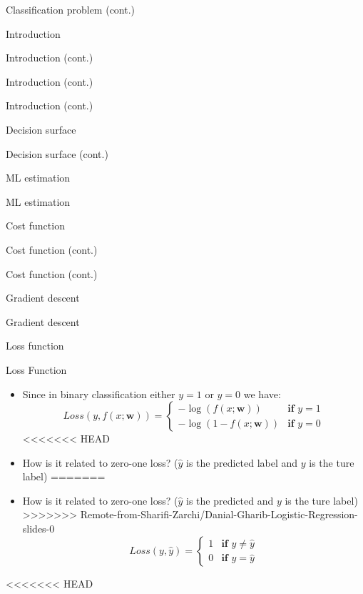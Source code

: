 \documentclass[serif, aspectratio=169]{beamer}
\begin{document}
\begin{frame}{Classification problem (cont.)}
\begin{itemize}
\begin{frame}{Introduction}
\begin{itemize}
\begin{frame}{Introduction (cont.)}
\begin{frame}{Introduction (cont.)}
\begin{frame}{Introduction (cont.)}
\begin{frame}{Decision surface}
\begin{itemize}
\begin{frame}{Decision surface (cont.)}
\begin{frame}{ML estimation}
\begin{frame}{ML estimation}
\begin{itemize}
\begin{frame}{Cost function}
\begin{frame}{Cost function (cont.)}
\begin{itemize}
\begin{itemize}
\begin{frame}{Cost function (cont.)}
\begin{frame}{Gradient descent}
\begin{frame}{Gradient descent}
\begin{frame}{Loss function}
\begin{frame}{Loss Function}
\begin{itemize}
        \item Since in binary classification either $y=1$ or $y=0$ we have:
            \[
                Loss(y, f(x; \mathbf{w})) = \begin{cases}
                    - \log (f(x; \mathbf{w})) & \textbf{if } y = 1 \\
                    - \log (1 - f(x; \mathbf{w})) & \textbf{if } y = 0
                \end{cases}
            \]
<<<<<<< HEAD
        \item How is it related to zero-one loss? ($\hat{y}$ is the predicted label and $y$ is the ture label)
=======
        \item How is it related to zero-one loss? ($\hat{y}$ is the predicted and $y$ is the ture label)
>>>>>>> Remote-from-Sharifi-Zarchi/Danial-Gharib-Logistic-Regression-slides-0
           \[
               Loss(y, \hat{y}) =  \begin{cases}
                    1 & \textbf{if } y \neq \hat{y} \\
                    0 & \textbf{if } y = \hat{y}
                \end{cases}
            \]
    \end{itemize}
\end{frame}

<<<<<<< HEAD


\end{frame}
\end{frame}
\end{frame}
\end{frame}
\end{itemize}
\end{itemize}
\end{frame}
\end{frame}
\end{itemize}
\end{frame}
\end{frame}
\end{frame}
\end{itemize}
\end{frame}
\end{frame}
\end{frame}
\end{frame}
\end{itemize}
\end{frame}
\end{itemize}
\end{frame}
\end{document}
